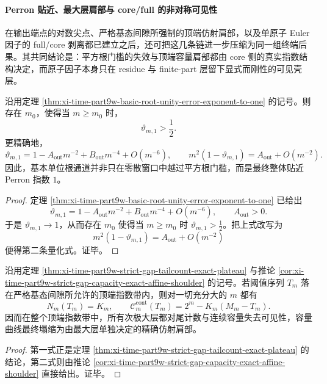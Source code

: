 \paragraph{Perron 贴近、最大层肩部与 core/full 的非对称可见性}
在输出端点的对数尖点、严格基态间隙所强制的顶端仿射肩部，以及单原子 Euler 因子的 full/core 剥离都已建立之后，还可把这几条链进一步压缩为同一组终端后果。其共同结论是：平方根门槛的失效与顶端容量肩部都由 core 侧的真实指数结构决定，而原子因子本身只在 residue 与 finite-part 层留下显式而刚性的可见壳层。

\begin{corollary}[基本单位根通道最终一致越过平方根门槛]\label{cor:xi-time-part9wa-basic-root-beyond-square-root}
沿用定理 \ref{thm:xi-time-part9w-basic-root-unity-error-exponent-to-one} 的记号。则存在 \(m_0\)，使得当 \(m\ge m_0\) 时，
\[
\vartheta_{m,1}>\frac12.
\]
更精确地，
\[
\vartheta_{m,1}
=
1-A_{\mathrm{out}}m^{-2}
+B_{\mathrm{out}}m^{-4}
+O(m^{-6}),
\qquad
m^2(1-\vartheta_{m,1})=A_{\mathrm{out}}+O(m^{-2}).
\]
因此，基本单位根通道并非只在零散窗口中越过平方根门槛，而是最终整体贴近 Perron 指数 \(1\)。
\end{corollary}
\begin{proof}
定理 \ref{thm:xi-time-part9w-basic-root-unity-error-exponent-to-one} 已给出
\[
\vartheta_{m,1}
=
1-A_{\mathrm{out}}m^{-2}
+B_{\mathrm{out}}m^{-4}
+O(m^{-6}),
\qquad
A_{\mathrm{out}}>0.
\]
于是 \(\vartheta_{m,1}\to 1\)，从而存在 \(m_0\) 使得当 \(m\ge m_0\) 时 \(\vartheta_{m,1}>\tfrac12\)。把上式改写为
\[
m^2(1-\vartheta_{m,1})=A_{\mathrm{out}}+O(m^{-2})
\]
便得第二条量化式。证毕。
\end{proof}

\begin{corollary}[顶端指数带完全由最大层控制]\label{cor:xi-time-part9wa-top-band-max-layer-sufficiency}
沿用定理 \ref{thm:xi-time-part9w-strict-gap-tailcount-exact-plateau} 与推论 \ref{cor:xi-time-part9w-strict-gap-capacity-exact-affine-shoulder} 的记号。若阈值序列 \(T_m\) 落在严格基态间隙所允许的顶端指数带内，则对一切充分大的 \(m\) 都有
\[
N_m(T_m)=K_m,
\qquad
\mathcal C_m^{\mathrm{cont}}(T_m)=2^m-K_m(M_m-T_m).
\]
因而在整个顶端指数带中，所有次极大层都对尾计数与连续容量失去可见性，容量曲线最终塌缩为由最大层单独决定的精确仿射肩部。
\end{corollary}
\begin{proof}
第一式正是定理 \ref{thm:xi-time-part9w-strict-gap-tailcount-exact-plateau} 的结论，第二式则由推论 \ref{cor:xi-time-part9w-strict-gap-capacity-exact-affine-shoulder} 直接给出。证毕。
\end{proof}

